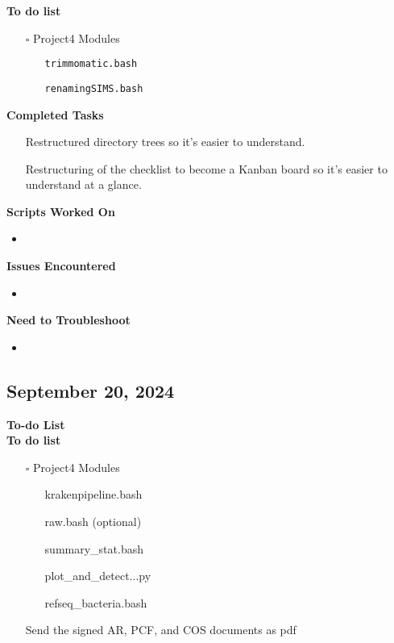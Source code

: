 \documentclass[11pt]{report}
\newcommand{\done}{\checkmark}
\newcommand{\pending}{$\square$}
\begin{document}
{\begin{multicols}{2}
\textbf{To do list}
\begin{itemize}
	\item [\pending] Project4 Modules
	\begin{itemize}
		\item [\done] \texttt{trimmomatic.bash}
		\item [\done] \texttt{renamingSIMS.bash}
	\end{itemize}
\end{itemize}

\textbf{Completed Tasks} 
\begin{itemize}
	\item [\done] Restructured directory trees so it's easier to understand. 
	\item [\done] Restructuring of the checklist to become a Kanban board so it's easier to understand at a glance.
\end{itemize}

\textbf{Scripts Worked On}
\begin{itemize}
	\item 
\end{itemize}


\textbf{Issues Encountered}
\begin{itemize}
	\item  
\end{itemize}

\textbf{Need to Troubleshoot}
\begin{itemize}
	\item 
\end{itemize}
\end{multicols}

\newpage

\newpage

\begin{multicols}{2}
\section{September 20, 2024}
\textbf{To-do List} \\


\textbf{To do list}
	\begin{itemize}
		\item [\pending] Project4 Modules
			\begin{itemize}
				\item [\done] krakenpipeline.bash
				\item [\done] raw.bash (optional)
				\item [\done] summary\_stat.bash
				\item [\done] plot\_and\_detect...py
				\item [\done] refseq\_bacteria.bash 
			\end{itemize}
		\item [\done] Send the signed AR, PCF, and COS documents as pdf
	\end{itemize}


\end{multicols}}
\end{document}
